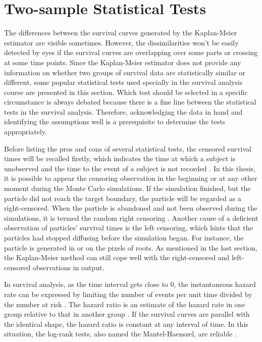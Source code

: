 \section{Two-sample Statistical Tests}

The differences between the survival curves generated by the
Kaplan-Meier estimator are visible sometimes. However, the
dissimilarities won't be easily detected by eyes if the survival
curves are overlapping over some parts or crossing at some time
points.  Since the Kaplan-Meier estimator does not provide any
information on whether two groups of survival data are statistically
similar or different, some popular statistical tests used specially in
the survival analysis course are presented in this section. Which test
should be selected in a specific circumstance is always debated
because there is a fine line between the statistical tests in the
survival analysis. Therefore, acknowledging the data in hand and
identifying the assumptions well is a prerequisite to determine the
tests appropriately.

Before listing the pros and cons of several statistical tests, the
censored survival times will be recalled firstly, which indicates the
time at which a subject is unobserved and the time to the event of a
subject is not recorded \cite{etikan2018choosing}. In this thesis, it
is possible to appear the censoring observation in the beginning or at
any other moment during the Monte Carlo simulations. If the simulation
finished, but the particle did not reach the target boundary, the
particle will be regarded as a right-censored. When the particle is
abandoned and not been observed during the simulations, it is termed
the random right censoring \cite{etikan2018choosing}. Another cause of
a deficient observation of particles' survival times is the left
censoring, which hints that the particles had stopped diffusing before
the simulation began. For instance, the particle is generated in or on
the pixels of roots. As mentioned in the last section, the
Kaplan-Meier method can still cope well with the right-censored and
left-censored observations in output.


In survival analysis, as the time interval gets close to $0$, the
instantaneous hazard rate can be expressed by limiting the number of
events per unit time divided by the number at risk
\cite{case2002interpreting}. The hazard ratio is an estimate of the
hazard rate in one group relative to that in another group
\cite{singh2011survival}. If the survival curves are parallel with the
identical shape, the hazard ratio is constant at any interval of
time. In this situation, the log-rank tests, also named the
Mantel-Haenszel, are reliable \cite{custodio2007diagnostics}.

